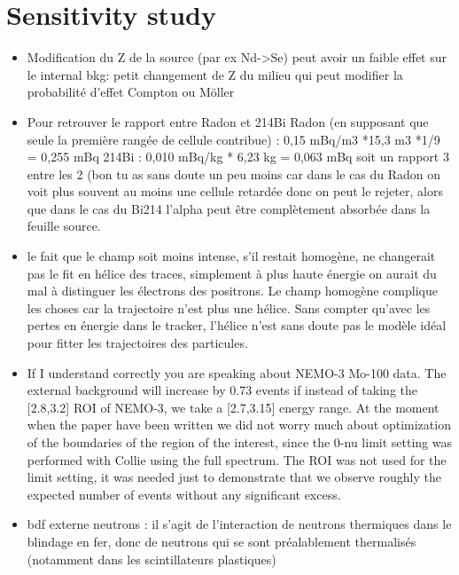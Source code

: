 \documentclass[a4paper,12pt, twoside]{memoir}   	%
\begin{document}
               \chapter{Sensitivity study}
               \begin{itemize}
               \item Modification du Z de la source (par ex Nd->Se) peut avoir un faible effet sur le internal bkg: petit changement de Z du milieu qui peut modifier la probabilité d'effet Compton ou Möller
               \item Pour retrouver le rapport entre Radon et 214Bi
                 Radon (en supposant que seule la première rangée de cellule contribue) : 0,15 mBq/m3 *15,3 m3 *1/9 = 0,255 mBq
                 214Bi : 0,010 mBq/kg * 6,23  kg = 0,063 mBq
                 soit un rapport 3 entre les 2 (bon tu as sans doute un peu moins car dans le cas du Radon on voit plus souvent au moins une cellule retardée donc on peut le rejeter, alors que dans le cas du Bi214 l'alpha peut être complètement absorbée dans la feuille source.
               \item  le fait que le champ soit moins intense, s'il restait homogène, ne changerait pas le fit en hélice des traces, simplement à plus haute énergie on aurait du mal à distinguer les électrons des positrons.
                 Le champ homogène complique les choses car la trajectoire n'est plus une hélice.
                 Sans compter qu'avec les pertes en énergie dans le tracker, l'hélice n'est sans doute pas le modèle idéal pour fitter les trajectoires des particules.
               \item If I understand correctly you are speaking about NEMO-3 Mo-100 data.
                 The external background will increase by 0.73 events if
                 instead of taking the [2.8,3.2] ROI of NEMO-3, we take a [2.7,3.15] energy range.
                 At the moment when the paper have been written we did not worry much about
                 optimization of the boundaries of the region of the interest, since the 0-nu limit
                 setting was performed with Collie using the full spectrum.
                 The ROI was not used for the limit setting, it was needed just to demonstrate that
                 we observe roughly the expected number of events without any significant excess.
               \item bdf externe neutrons : il s'agit de l'interaction de neutrons thermiques dans le blindage en fer, donc de neutrons qui se sont préalablement thermalisés (notamment dans les scintillateurs plastiques)

\end{itemize}
\end{document}
